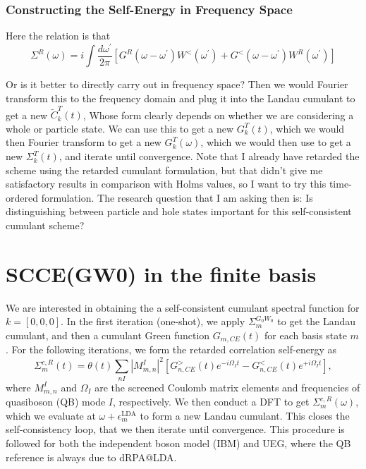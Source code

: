 \subsubsection{Constructing the Self-Energy in Frequency Space}
Here the relation is that 
\begin{equation}
\Sigma^R(\omega)=i \int \frac{d \omega^{\prime}}{2 \pi}\left[G^R\left(\omega-\omega^{\prime}\right) W^{<}\left(\omega^{\prime}\right)+G^{<}\left(\omega-\omega^{\prime}\right) W^R\left(\omega^{\prime}\right)\right]
\end{equation}

Or is it better to directly carry out in frequency space? 
 Then we would Fourier transform this to the frequency domain and plug it into the Landau cumulant to get a new $\tilde{C}_k^T(t)$, Whose form clearly depends on whether we are considering a whole or particle state. We can use this to get a new $G_k^T(t)$, which we would then Fourier transform to get a new $G_k^T(\omega)$, which we would then use to get a new $\Sigma_k^T(t)$, and iterate until convergence. Note that I already have retarded the scheme using the retarded cumulant formulation, but that didn't give me satisfactory results in comparison with Holms values, so I want to try this time-ordered formulation. The research question that I am asking then is: Is distinguishing between particle and hole states important for this self-consistent cumulant scheme? 
\section{SCCE(GW0) in the finite basis}
We are interested in obtaining the a self-consistent cumulant spectral function for $k=[0,0,0]$. In the first iteration (one-shot), we apply $\Sigma_m^{G_0W_0}$ to get the Landau cumulant, and then a cumulant Green function ${G}_{m,CE}(t)$ for each basis state $m$. For the following iterations, we form the retarded correlation self-energy as 
\begin{equation}
    \Sigma_{m}^{c,R}(t)=\theta(t) \sum_{n I}\left|M_{ m,n}^I\right|^2\left[G_{n,CE}^{>}(t) e^{-i \Omega_I t}-G_{n,CE}^{<}(t) e^{+i \Omega_I t}\right],
\label{eq:scce_gw0}
\end{equation}
where $M_{m,n}^I$ and $\Omega_I$ are the screened Coulomb matrix elements and frequencies of quasiboson (QB) mode $I$, respectively. We then conduct a DFT to get $\Sigma_{m}^{c,R}(\omega)$, which we evaluate at $\omega+\epsilon_m^{\mathrm{LDA}}$ to form a new Landau cumulant. This closes the self-consistency loop, that we then iterate until convergence. 
This procedure is followed for both the independent boson model (IBM) and UEG, where the QB reference is always due to dRPA@LDA.
